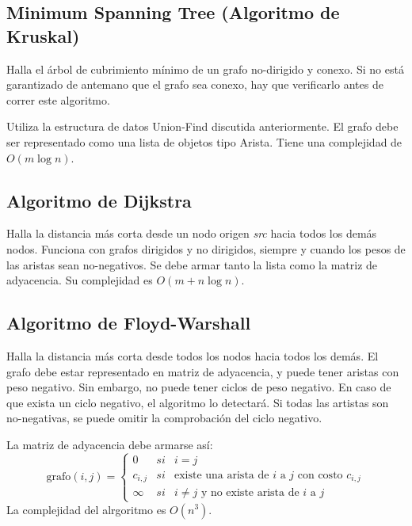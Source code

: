 \documentclass{article}
\begin{document}
\begin{multicols}{2}
	\subsection{Minimum Spanning Tree (Algoritmo de Kruskal)}
	Halla el árbol de cubrimiento mínimo de un grafo no-dirigido y conexo. Si no está garantizado de antemano que el grafo sea conexo, hay que verificarlo antes de correr este algoritmo. 
		
	Utiliza la estructura de datos Union-Find discutida anteriormente. El grafo debe ser representado como una lista de objetos tipo Arista. Tiene una complejidad de \( O( m \log n) \).	
	
	
	\subsection{Algoritmo de Dijkstra}
	Halla la distancia más corta desde un nodo origen \emph{src} hacia todos los demás nodos. Funciona con grafos dirigidos y no dirigidos, siempre y cuando los pesos de las aristas sean no-negativos. Se debe armar tanto la lista como la matriz de adyacencia. Su complejidad es \( O(m + n \log n) \).
	
	
	\subsection{Algoritmo de Floyd-Warshall}
	Halla la distancia más corta desde todos los nodos hacia todos los demás. El grafo debe estar representado en matriz de adyacencia, y puede tener aristas con peso negativo. Sin embargo, no puede tener ciclos de peso negativo. En caso de que exista un ciclo negativo, el algoritmo lo detectará. Si todas las artistas son no-negativas, se puede omitir la comprobación del ciclo negativo.
	
	La matriz de adyacencia debe armarse así:
	\[
		\text{grafo}(i, j) = \left \{ 
			\begin{array}{lcc}
				0 & si & i = j
				\\ c_{i,j} & si & \text{existe una arista de } i \text{ a } j \text{ con costo } c_{i,j}
				\\ \infty & si & i \neq j \text{ y no existe arista de } i \text{ a } j 
			\end{array}
		\right.
	\]
	La complejidad del alrgoritmo es \( O(n^3) \).
	


\end{multicols}
\end{document}
